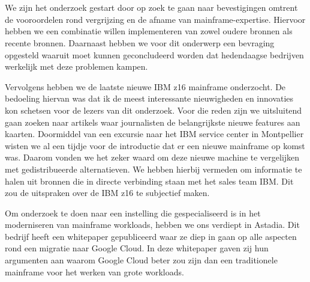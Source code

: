 
\chapter{}
\label{ch:methodologie}



\section{}
\label{sec:De literatuur- en vergelijkende studie}

We zijn het onderzoek gestart door op zoek te gaan naar bevestigingen omtrent de vooroordelen rond vergrijzing en de afname van mainframe-expertise. Hiervoor hebben we een combinatie willen implementeren van zowel oudere bronnen als recente bronnen. Daarnaast hebben we voor dit onderwerp een bevraging opgesteld waaruit moet kunnen geconcludeerd worden dat hedendaagse bedrijven werkelijk met deze problemen kampen. 

Vervolgens hebben we de laatste nieuwe IBM z16 mainframe onderzocht. De bedoeling hiervan was dat ik de meest interessante nieuwigheden en innovaties kon schetsen voor de lezers van dit onderzoek. Voor die reden zijn we uitsluitend gaan zoeken naar artikels waar journalisten de belangrijkste nieuwe features aan kaarten. Doormiddel van een excursie naar het IBM service center in Montpellier wisten we al een tijdje voor de introductie dat er een nieuwe mainframe op komst was. Daarom vonden we het zeker waard om deze nieuwe machine te vergelijken met gedistribueerde alternatieven. We hebben hierbij vermeden om informatie te halen uit bronnen die in directe verbinding staan met het sales team IBM. Dit zou de uitspraken over de IBM z16 te subjectief maken. 

Om onderzoek te doen naar een instelling die gespecialiseerd is in het moderniseren van mainframe workloads, hebben we ons verdiept in Astadia. Dit bedrijf heeft een whitepaper gepubliceerd waar ze diep in gaan op alle aspecten rond een migratie naar Google Cloud. In deze whitepaper gaven zij hun argumenten aan waarom Google Cloud beter zou zijn dan een traditionele mainframe voor het werken van grote workloads. 


